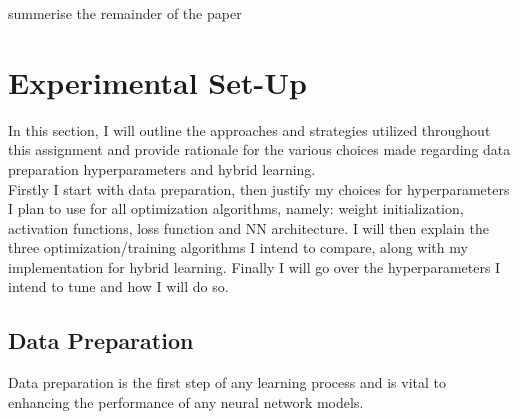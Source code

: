 \documentclass[conference]{IEEEtran}
\begin{document}
summerise the remainder of the paper

\section{Experimental Set-Up}
In this section, I will outline the approaches and strategies utilized throughout this assignment and provide rationale for the various choices made regarding data preparation hyperparameters and hybrid learning. \\

Firstly I start with data preparation, then justify my choices for hyperparameters I plan to use for all optimization algorithms, namely: weight initialization, activation functions, loss function and NN architecture. I will then explain the three optimization/training algorithms I intend to compare, along with my implementation for hybrid learning. Finally I will go over the hyperparameters I intend to tune and how I will do so. \\ 
\subsection{Data Preparation}
Data preparation is the first step of any learning process and is vital to enhancing the performance of any neural network models.
\end{document}
